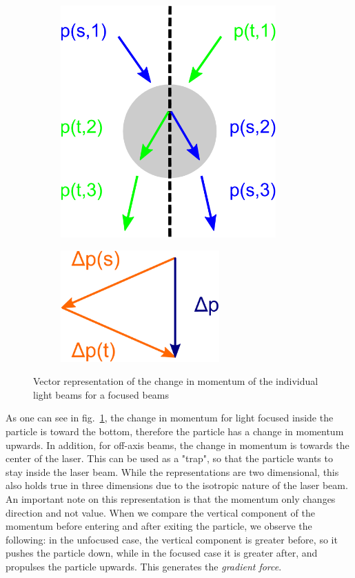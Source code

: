 \documentclass{article}
\begin{document}
\begin{figure}[!ht]
    \centering
    \begin{subfigure}{0.49\textwidth}
        \centering
        \includegraphics[height=0.5\textwidth]{laserFocusedBeam.png} 
    \end{subfigure}
    \begin{subfigure}{0.49\textwidth}
        \centering
        \includegraphics[height=0.5\textwidth]{momentumChangeFocusedBeam.png}
    \end{subfigure}
    \caption{Vector representation of the change in momentum of the individual light beams for a focused beams}
    \label{fig:focusedBeam}
\end{figure}
\FloatBarrier

As one can see in fig.~\ref{fig:focusedBeam}, the change in momentum for light focused inside the particle is toward the bottom, therefore the particle has a change in momentum upwards. In addition, for off-axis beams, the change in momentum is towards the center of the laser. This can be used as a "trap", so that the particle wants to stay inside the laser beam. While the representations are two dimensional, this also holds true in three dimensions due to the isotropic nature of the laser beam. An important note on this representation is that the momentum only changes direction and not value. When we compare the vertical component of the momentum before entering and after exiting the particle, we observe the following: in the unfocused case, the vertical component is greater before, so it pushes the particle down, while in the focused case it is greater after, and propulses the particle upwards. This generates the \textit{gradient force}. \medskip
\end{document}
